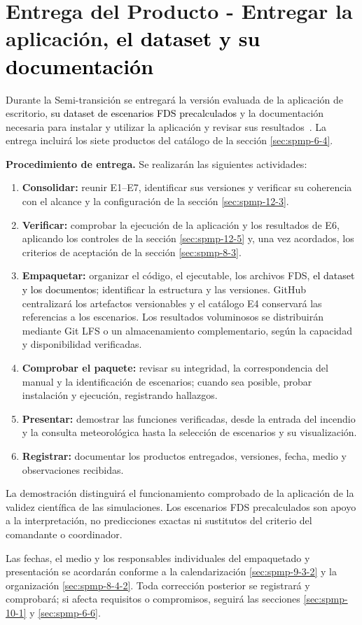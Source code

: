 
\clearpage
\section{Entrega del Producto - Entregar la aplicación, \textcolor{black}{el dataset y su documentación}}\label{sec:spmp-11}

Durante la Semi-transición se entregará la versión evaluada de la aplicación de escritorio, \textcolor{black}{su dataset de escenarios FDS precalculados} y la documentación necesaria para instalar y utilizar la aplicación y revisar sus resultados~\cite{adaptacion2026,std12207}. La entrega incluirá los siete productos del catálogo de la sección \ref{sec:spmp-6-4}.

\textbf{Procedimiento de entrega.} Se realizarán las siguientes actividades:

\begin{enumerate}
    \item \textbf{Consolidar:} reunir E1--E7, identificar sus versiones y verificar su coherencia con el alcance y la configuración de la sección \ref{sec:spmp-12-3}.
    \item \textbf{Verificar:} comprobar la ejecución de la aplicación y los resultados de E6, aplicando los controles de la sección \ref{sec:spmp-12-5} y, una vez acordados, los criterios de aceptación de la sección \ref{sec:spmp-8-3}.
    \item \textbf{Empaquetar:} organizar el código, el ejecutable, los archivos FDS, \textcolor{black}{el dataset y los documentos}; identificar la estructura y las versiones. GitHub centralizará los artefactos versionables y el catálogo E4 conservará las referencias a los escenarios. Los resultados voluminosos se distribuirán mediante Git LFS o un almacenamiento complementario, según la capacidad y disponibilidad verificadas.
    \item \textbf{Comprobar el paquete:} revisar su integridad, la correspondencia del manual y la identificación de escenarios; cuando sea posible, probar instalación y ejecución, registrando hallazgos.
    \item \textbf{Presentar:} demostrar las funciones verificadas, desde la entrada del incendio y la consulta meteorológica hasta la selección de escenarios y su visualización.
    \item \textbf{Registrar:} documentar los productos entregados, versiones, fecha, medio y observaciones recibidas.
\end{enumerate}

La demostración distinguirá el funcionamiento comprobado de la aplicación de la validez científica de las simulaciones. Los escenarios FDS precalculados son apoyo a la interpretación, no predicciones exactas ni sustitutos del criterio del comandante o coordinador.

Las fechas, el medio y los responsables individuales del empaquetado y presentación se acordarán conforme a la calendarización \ref{sec:spmp-9-3-2} y la organización \ref{sec:spmp-8-4-2}. Toda corrección posterior se registrará y comprobará; si afecta requisitos o compromisos, seguirá las secciones \ref{sec:spmp-10-1} y \ref{sec:spmp-6-6}.
